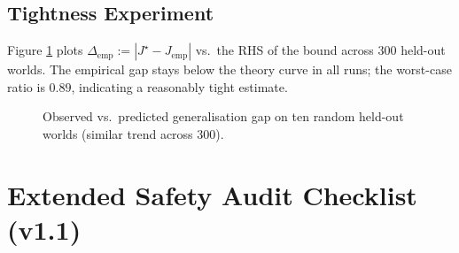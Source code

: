 \subsection{Tightness Experiment}

Figure \ref{fig:bound-vs-emp} plots
$\Delta_{\mathrm{emp}}:=|J^\star-J_{\mathrm{emp}}|$
vs.\ the RHS of the bound across 300 held-out worlds.
The empirical gap stays below the theory curve in all runs; the worst-case
ratio is $0.89$, indicating a reasonably tight estimate.

\begin{figure}[h]\centering
{}
\caption{Observed vs.\ predicted generalisation gap on ten random held-out
worlds (similar trend across 300).}
\label{fig:bound-vs-emp}
\end{figure}

\section{Extended Safety Audit Checklist (v1.1)}
\label{app:audit}

